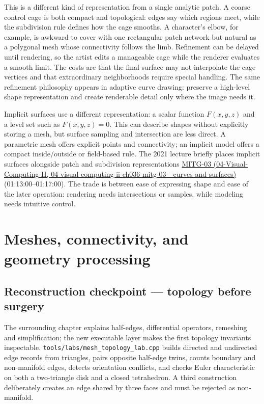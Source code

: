 This is a different kind of representation from a single analytic patch. A coarse control cage is both compact and topological: edges say which regions meet, while the subdivision rule defines how the cage smooths. A character's elbow, for example, is awkward to cover with one rectangular patch network but natural as a polygonal mesh whose connectivity follows the limb. Refinement can be delayed until rendering, so the artist edits a manageable cage while the renderer evaluates a smooth limit. The costs are that the final surface may not interpolate the cage vertices and that extraordinary neighborhoods require special handling. The same refinement philosophy appears in adaptive curve drawing: preserve a high-level shape representation and create renderable detail only where the image needs it.

Implicit surfaces use a different representation: a scalar function \(F(x,y,z)\) and a level set such as \(F(x,y,z)=0\). This can describe shapes without explicitly storing a mesh, but surface sampling and intersection are less direct. A parametric mesh offers explicit points and connectivity; an implicit model offers a compact inside/outside or field-based rule. The 2021 lecture briefly places implicit surfaces alongside patch and subdivision representations \href{../04-Visual-Computing-II/main.pdf\#nameddest=04-visual-computing-ii-ch036-mitg-03---curves-and-surfaces}{MITG-03 (04-Visual-Computing-II, 04-visual-computing-ii-ch036-mitg-03-\/-\/-curves-and-surfaces)} (01:13:00--01:17:00). The trade is between ease of expressing shape and ease of the later operation: rendering needs intersections or samples, while modeling needs intuitive control.

\section{Meshes, connectivity, and geometry processing}\label{03-visual-computing-i-ch002-meshes-connectivity-and-geometry-processing}

\subsection{Reconstruction checkpoint --- topology before surgery}\label{03-visual-computing-i-ch002-reconstruction-checkpoint-topology-before-surgery}

The surrounding chapter explains half-edges, differential operators, remeshing and simplification; the new executable layer makes the first topology invariants inspectable. \texttt{tools/labs/mesh\_topology\_lab.cpp} builds directed and undirected edge records from triangles, pairs opposite half-edge twins, counts boundary and non-manifold edges, detects orientation conflicts, and checks Euler characteristic on both a two-triangle disk and a closed tetrahedron. A third construction deliberately creates an edge shared by three faces and must be rejected as non-manifold.

